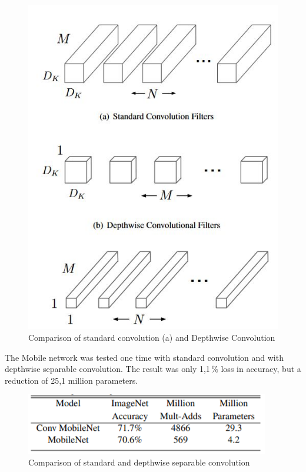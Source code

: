 \begin{figure}[H]
\centering
\includegraphics[scale=0.65]{sources/depthwise_convolution.JPG}
\caption[Comparison standard and depthwise]{Comparison of standard convolution (a) and Depthwise Convolution \cite{tim2,tim3}}
\label{fig:depthwise_convolution}
\end{figure}

\newpage

The Mobile network was tested one time with standard convolution and with depthwise separable convolution. The result was only 1,1\,\% loss in accuracy, but a reduction of 25,1 million parameters. 

\begin{figure}[H]
\centering
\includegraphics{sources/Comparison_Mobilenet.png}
\caption[Comparison standard and separable depthwise]{Comparison of standard and depthwise separable convolution}
\label{fig:depthwise_convolution}
\end{figure}

